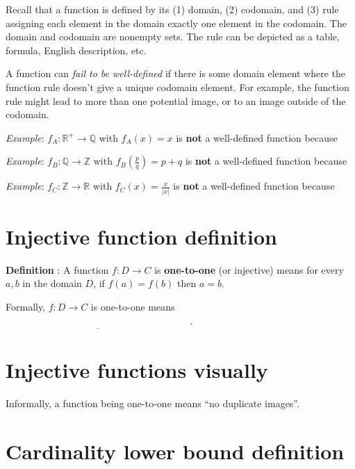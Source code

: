 \documentclass[12pt, oneside]{article}
\begin{document}
Recall that a function is defined by its (1) domain, (2) codomain, and (3) rule assigning each 
element in the domain exactly one element in the codomain. 
The domain and codomain are nonempty sets.
The rule can be depicted as a table, formula, English description, etc.

A function can {\it fail to be well-defined} if there is some 
domain element where the function rule doesn't give a
unique codomain element. For example, the function rule might lead to 
more than one potential image, or to an image outside of the codomain.


{\it Example}: $f_A: \mathbb{R}^+ \to \mathbb{Q}$ with $f_A(x) = x$ is {\bf not} a well-defined function because

\vspace{100pt}


{\it Example}: $f_B: \mathbb{Q} \to \mathbb{Z}$ with $f_B\left(\frac{p}{q}\right) = p+q$ is {\bf not} a well-defined function because

\vspace{100pt}


{\it Example}: $f_C: \mathbb{Z} \to \mathbb{R}$ with $f_C(x) = \frac{x}{|x|}$ is {\bf not} a well-defined function because

\vspace{100pt}
 \vfill
\section*{Injective function definition}


{\bf Definition} : A function $f: D  \to C$ is {\bf one-to-one} (or  injective) 
means for every $a,b$ in the domain $D$, 
if $f(a) = f(b)$ then  $a=b$.

Formally, $f: D  \to  C$ is  one-to-one  means $\underline{\phantom{\forall a \in D \forall b \in D ~(f(a) = f(b) \to a = b)}}$.
 \vfill
\section*{Injective functions visually}


Informally, a function being one-to-one means ``no duplicate images''.

\phantom{Draw finite domain, finite codomain picture with duplicate image.}
\vspace{50pt} \vfill
\section*{Cardinality lower bound definition}
\end{document}
